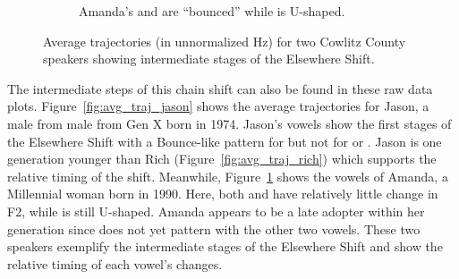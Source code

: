 \begin{figure}[tb!]
\begin{subfigure}[t]{2.925in}
        \caption{Amanda's \bat and \bet are ``bounced'' while \bit is U-shaped.}
        \label{fig:avg_traj_amanda}
    \end{subfigure}
    \hspace{\fill}
    \caption{Average trajectories (in unnormalized Hz) for two Cowlitz County speakers showing intermediate stages of the Elsewhere Shift.}
    \label{fig:jason_and_amanda}
\end{figure}

The intermediate steps of this chain shift can also be found in these raw data plots. Figure~\ref{fig:avg_traj_jason} shows the average trajectories for Jason, a male from male from Gen X born in 1974. Jason's vowels show the first stages of the Elsewhere Shift with a Bounce-like pattern for \bat but not for \bet or \bit. Jason is one generation younger than Rich (Figure~\ref{fig:avg_traj_rich}) which supports the relative timing of the shift. Meanwhile, Figure~\ref{fig:avg_traj_amanda} shows the vowels of Amanda, a Millennial woman born in 1990. Here, both \bat and \bet have relatively little change in F2, while \bit is still U-shaped. Amanda appears to be a late adopter within her generation since \bit does not yet pattern with the other two vowels. These two speakers exemplify the intermediate stages of the Elsewhere Shift and show the relative timing of each vowel's changes.

